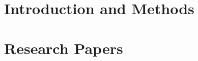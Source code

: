 \documentclass[10pt,twoside,openright]{memoir}
\begin{document}



\frontmatter
\setcounter{page}{3}

\cleardoublepage

\cleardoublepage

\cleardoublepage

\cleardoublepage
\tableofcontents
\cleardoublepage
\listoffigures
\cleardoublepage
\listoftables
\cleardoublepage


\mainmatter
\part[Part I]{Introduction and Methods}
\pagestyle{ruled}










\appendix
\backmatter
\printbibliography[title=References]

\makeatletter
\def\pagenumbering#1{%
  \gdef\thepage{\csname @#1\endcsname \c@page}}
\makeatother

\mainmatter
\part[Part II]{Research Papers}
\pagenumbering{gobble}
\pagestyle{cleared}

\end{document}

